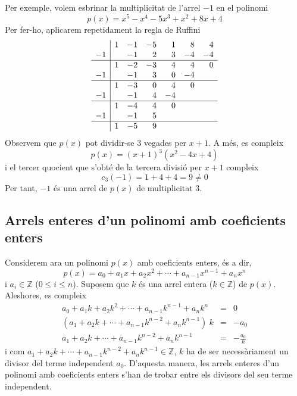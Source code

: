 Per exemple, volem esbrinar la multiplicitat de l'arrel $-1$ en el
polinomi\begin{equation*}
p(x)=x^{5}-x^{4}-5x^{3}+x^{2}+8x+4
\end{equation*}Per fer-ho, aplicarem repetidament la regla de Ruffini\begin{equation*}
\begin{array}{r|rrrrrr}
& 1 & -1 & -5 & 1 & 8 & 4 \\
-1 & & -1 & 2 & 3 & -4 & -4 \\ \hline
& 1 & -2 & -3 & 4 & 4 & 0 \\
-1 & & -1 & 3 & 0 & -4 & \\ \hline
& 1 & -3 & 0 & 4 & 0 & \\
-1 & & -1 & 4 & -4 & & \\ \hline
& 1 & -4 & 4 & 0 & & \\
-1 & & -1 & 5 & & & \\ \hline
& 1 & -5 & 9 & & &
\end{array}\end{equation*}
Observem que $p(x)$ pot dividir-se 3 vegades per $x+1$. A més, es
compleix\begin{equation*}
p(x)=(x+1)^{3}(x^{2}-4x+4)
\end{equation*}i el tercer quocient que s’obté de la tercera divisió per $x+1$
compleix\begin{equation*}
c_{3}(-1)=1+4+4=9\neq 0
\end{equation*}Per tant, $-1$ és una arrel de $p(x)$ de multiplicitat $3$.

\subsection{Arrels enteres d'un polinomi amb coeficients enters}

Considerem ara un polinomi $p(x)$ amb coeficients enters, és a dir,\begin{equation*}
p(x)=a_{0}+a_{1}x+a_{2}x^{2}+\cdots +a_{n-1}x^{n-1}+a_{n}x^{n}
\end{equation*}i $a_{i}\in \mathbb{Z}$ ($0\leq i\leq n$). Suposem que $k$ és una arrel entera ($k\in \mathbb{Z}$) de $p(x)$. Aleshores, es compleix\begin{eqnarray*}
a_{0}+a_{1}k+a_{2}k^{2}+\cdots +a_{n-1}k^{n-1}+a_{n}k^{n} &=&0 \\
(a_{1}+a_{2}k+\cdots +a_{n-1}k^{n-2}+a_{n}k^{n-1})~k &=&-a_{0} \\
a_{1}+a_{2}k+\cdots +a_{n-1}k^{n-2}+a_{n}k^{n-1} &=&-\frac{a_{0}}{k}
\end{eqnarray*}i com $a_{1}+a_{2}k+\cdots +a_{n-1}k^{n-2}+a_{n}k^{n-1}\in \mathbb{Z}$, $k$
ha de ser necessàriament un divisor del terme independent $a_{0}$.
D'aquesta manera, les arrels enteres d'un polinomi amb coeficients
enters s'han de trobar entre els divisors del seu terme
independent.

